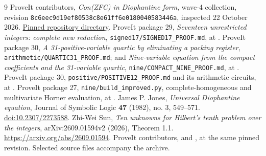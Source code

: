 \documentclass[11pt]{article}
\theoremstyle{remark}\newtheorem{remark}[theorem]{Remark}
\newcommand{\pin}{\texttt{8c6eec9d19ef80538c8e61ff6e0180040583446a}}
\begin{document}
\begin{thebibliography}{9}
 ProveIt contributors, \emph{Con(ZFC) in Diophantine form},
wave-4 collection, revision \pin, inspected 22 October 2026.
\href{https://github.com/VladimirReshetnikov/ProveIt/tree/8c6eec9d19ef80538c8e61ff6e0180040583446a/SetTheory/Cardinals/docs/reports/hilbert-tenth-problem/con-zfc-diophantine-forms}{Pinned repository directory}.
 ProveIt package 29, \emph{Seventeen unrestricted integers:
complete new reduction}, \texttt{signed17/SIGNED17\_PROOF.md}, at \cite{repo}.
 ProveIt package 30, \emph{A 31-positive-variable quartic
by eliminating a packing register}, \texttt{arithmetic/QUARTIC31\_PROOF.md};
and \emph{Nine-variable equation from the compact coefficients and the
31-variable quartic}, \texttt{nine/COMPACT\_NINE\_PROOF.md}, at \cite{repo}.
 ProveIt package 30, \texttt{positive/POSITIVE12\_PROOF.md}
and its arithmetic circuits, at \cite{repo}.
 ProveIt package 27, \texttt{nine/build\_improved.py},
complete-homogeneous and multivariate Horner evaluation, at \cite{repo}.
 James P. Jones, \emph{Universal Diophantine equation},
Journal of Symbolic Logic \textbf{47} (1982), no. 3, 549--571.
\href{https://doi.org/10.2307/2273588}{doi:10.2307/2273588}.
 Zhi-Wei Sun, \emph{Ten unknowns for Hilbert's tenth problem
over the integers}, arXiv:2609.01594v2 (2026), Theorem 1.1.
\url{https://arxiv.org/abs/2609.01594}.
 ProveIt contributors,
and ,
at the same pinned revision. Selected source files accompany the archive.
\end{thebibliography}
\end{document}

